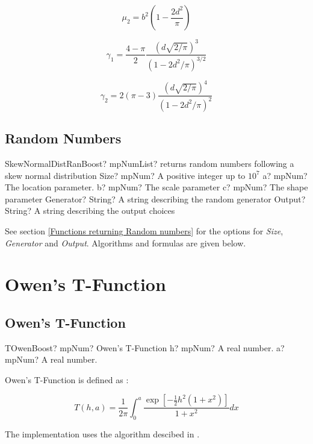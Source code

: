 \begin{equation} 
	\mu_2 = b^2 \left(1-\frac{2d^2}{\pi} \right)
\end{equation}

\begin{equation} 
	\gamma_1 = \frac{4-\pi}{2} \frac{\left(d\sqrt{2/\pi}\right)^3}{(1-2d^2/\pi)^{3/2}}
\end{equation}

\begin{equation} 
	\gamma_2 = 2(\pi-3) \frac{\left(d\sqrt{2/\pi}\right)^4}{(1-2d^2/\pi)^{2}}
\end{equation}


\subsection{Random Numbers}
\label{SkewNormalDistributionRandom}

\begin{mpFunctionsExtract}
	\mpFunctionSix
	{SkewNormalDistRanBoost? mpNumList? returns random numbers following a skew normal distribution}
	{Size? mpNum? A positive integer up to $10^7$}
	{a? mpNum? The location parameter.}
	{b? mpNum? The scale parameter}
	{c? mpNum? The shape parameter}
	{Generator? String? A string describing the random generator}
	{Output? String? A string describing the output choices}
\end{mpFunctionsExtract}

\vspace{0.3cm}

See section \ref{Functions returning Random numbers} for the options for  {\itshape\sffamily Size},  {\itshape\sffamily Generator} and {\itshape\sffamily Output}. Algorithms and formulas are given below.






\section{Owen's T-Function}
\subsection{Owen's T-Function}
\label{sec:OwenTFunction}


\begin{mpFunctionsExtract}
	\mpFunctionTwo
	{TOwenBoost? mpNum? Owen's T-Function}
	{h? mpNum? A real number.}
	{a? mpNum? A real number.}
\end{mpFunctionsExtract}

\vspace{0.3cm}
Owen's T-Function is defined as \citep{owen_1956}:

\begin{equation}
	T(h,a) = \frac{1}{2\pi} \int_0^a \frac{\exp \left[-\tfrac{1}{2} h^2 (1+x^2)\right]}{1+x^2} dx
\end{equation}

The implementation uses the algorithm descibed in \cite{patefield_2000}.



